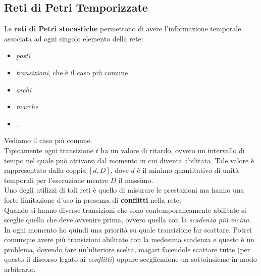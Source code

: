 \documentclass[a4paper,12pt, oneside]{book}
\begin{document}
\subsection{Reti di Petri Temporizzate}
Le \textbf{reti di Petri stocastiche} permettono di avere l'informazione
temporale associata ad ogni singolo elemento della rete:
\begin{itemize}
  \item \textit{posti}
  \item \textit{transizioni}, che è il caso più comune
  \item \textit{archi}
  \item \textit{marche}
  \item $\ldots$
\end{itemize}
Vediamo il caso più comune.\\
Tipicamente ogni transizione $t$ ha un valore di ritardo, ovvero un intervallo
di tempo nel quale può attivarsi dal momento in cui diventa abilitata. Tale
valore è rappresentato dalla coppia $[d,D]$, dove $d$ è il minimo quantitativo
di unità temporali per l'esecuzione mentre $D$ il massimo.\\
Uno degli utilizzi di tali reti è quello di misurare le prestazioni ma hanno una
forte limitazione d'uso in presenza di \textbf{conflitti} nella rete.\\
Quando si hanno diverse transizioni che sono contemporaneamente abilitate si
sceglie quella che deve avvenire prima, ovvero quella con la \textit{scadenza
  più vicina}. In ogni momento ho quindi una priorità su quale transizione far
scattare. Potrei comunque avere più transizioni abilitate con la medesima
scadenza e questo è un problema, dovendo fare un'ulteriore scelta, magari
facendole scattare tutte (per questo il discorso legato ai \textit{conflitti})
oppure scegliendone un sottoinsieme in modo arbitrario.
\end{document}
